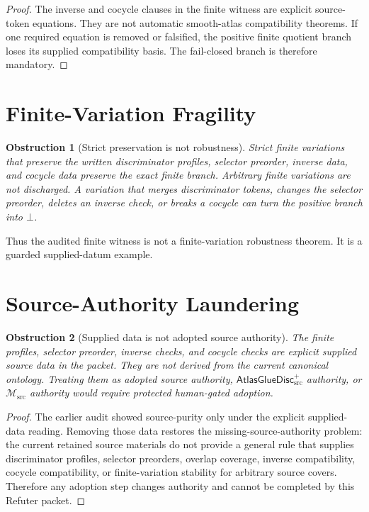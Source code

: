 \documentclass[11pt]{article}
\newcommand{\Msrc}{\mathcal{M}_{\mathrm{src}}}
\newcommand{\AtlasGlueDisc}{\mathsf{AtlasGlueDisc}_{\mathrm{src}}^{+}}
\newcommand{\Bot}{\bot}
\newtheorem{obstruction}{Obstruction}
\begin{document}
\begin{proof}
The inverse and cocycle clauses in the finite witness are explicit
source-token equations. They are not automatic smooth-atlas compatibility
theorems. If one required equation is removed or falsified, the positive
finite quotient branch loses its supplied compatibility basis. The
fail-closed branch is therefore mandatory.
\end{proof}

\section{Finite-Variation Fragility}

\begin{obstruction}[Strict preservation is not robustness]
Strict finite variations that preserve the written discriminator profiles,
selector preorder, inverse data, and cocycle data preserve the exact finite
branch. Arbitrary finite variations are not discharged. A variation that
merges discriminator tokens, changes the selector preorder, deletes an inverse
check, or breaks a cocycle can turn the positive branch into \(\Bot\).
\end{obstruction}

Thus the audited finite witness is not a finite-variation robustness theorem.
It is a guarded supplied-datum example.

\section{Source-Authority Laundering}

\begin{obstruction}[Supplied data is not adopted source authority]
The finite profiles, selector preorder, inverse checks, and cocycle checks are
explicit supplied source data in the packet. They are not derived from the
current canonical ontology. Treating them as adopted source authority,
\(\AtlasGlueDisc\) authority, or \(\Msrc\) authority would require protected
human-gated adoption.
\end{obstruction}

\begin{proof}
The earlier audit showed source-purity only under the explicit supplied-data
reading. Removing those data restores the missing-source-authority problem:
the current retained source materials do not provide a general rule that
supplies discriminator profiles, selector preorders, overlap coverage,
inverse compatibility, cocycle compatibility, or finite-variation stability
for arbitrary source covers. Therefore any adoption step changes authority and
cannot be completed by this Refuter packet.
\end{proof}
\end{document}
